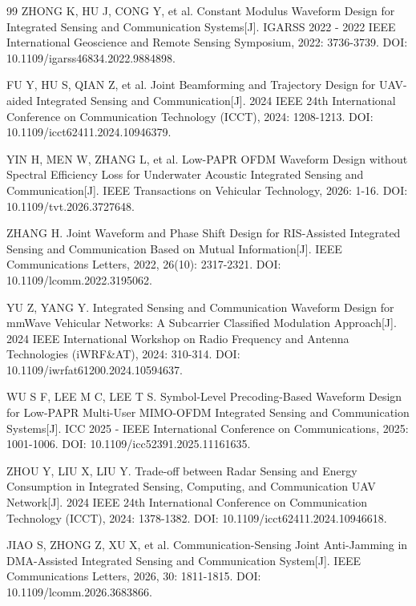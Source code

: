 \begin{thebibliography}{99}
ZHONG K, HU J, CONG Y, et al. Constant Modulus Waveform Design for Integrated Sensing and Communication Systems[J]. IGARSS 2022 - 2022 IEEE International Geoscience and Remote Sensing Symposium, 2022: 3736-3739. DOI: 10.1109/igarss46834.2022.9884898.

FU Y, HU S, QIAN Z, et al. Joint Beamforming and Trajectory Design for UAV-aided Integrated Sensing and Communication[J]. 2024 IEEE 24th International Conference on Communication Technology (ICCT), 2024: 1208-1213. DOI: 10.1109/icct62411.2024.10946379.

YIN H, MEN W, ZHANG L, et al. Low-PAPR OFDM Waveform Design without Spectral Efficiency Loss for Underwater Acoustic Integrated Sensing and Communication[J]. IEEE Transactions on Vehicular Technology, 2026: 1-16. DOI: 10.1109/tvt.2026.3727648.

ZHANG H. Joint Waveform and Phase Shift Design for RIS-Assisted Integrated Sensing and Communication Based on Mutual Information[J]. IEEE Communications Letters, 2022, 26(10): 2317-2321. DOI: 10.1109/lcomm.2022.3195062.

YU Z, YANG Y. Integrated Sensing and Communication Waveform Design for mmWave Vehicular Networks: A Subcarrier Classified Modulation Approach[J]. 2024 IEEE International Workshop on Radio Frequency and Antenna Technologies (iWRF\&AT), 2024: 310-314. DOI: 10.1109/iwrfat61200.2024.10594637.

WU S F, LEE M C, LEE T S. Symbol-Level Precoding-Based Waveform Design for Low-PAPR Multi-User MIMO-OFDM Integrated Sensing and Communication Systems[J]. ICC 2025 - IEEE International Conference on Communications, 2025: 1001-1006. DOI: 10.1109/icc52391.2025.11161635.

ZHOU Y, LIU X, LIU Y. Trade-off between Radar Sensing and Energy Consumption in Integrated Sensing, Computing, and Communication UAV Network[J]. 2024 IEEE 24th International Conference on Communication Technology (ICCT), 2024: 1378-1382. DOI: 10.1109/icct62411.2024.10946618.


 JIAO S, ZHONG Z, XU X, et al. Communication-Sensing Joint Anti-Jamming in DMA-Assisted Integrated Sensing and Communication System[J]. IEEE Communications Letters, 2026, 30: 1811-1815. DOI: 10.1109/lcomm.2026.3683866.


\end{thebibliography}
